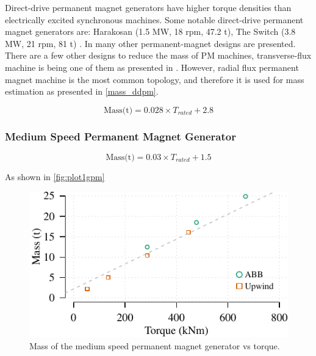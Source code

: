 \documentclass{article}\usepackage{graphicx, color}
\makeatletter
\def\maxwidth{ %
  \ifdim\Gin@nat@width>\linewidth
    \linewidth
  \else
    \Gin@nat@width
  \fi
}
\newenvironment{knitrout}{}{} %
\makeatother
\begin{document}
Direct-drive permanent magnet generators have higher torque densities than electrically excited synchronous machines. Some notable direct-drive permanent magnet generators are: Harakosan (1.5 MW, 18 rpm, 47.2 t), The Switch (3.8 MW, 21 rpm, 81 t) \cite{Duan2009}. In \cite{Bang2008,upwind2011} many other permanent-magnet designs are presented. There are a few other designs to reduce the mass of PM machines, transverse-flux machine is being one of them as presented in \cite{Bang2009}. However, radial flux permanent magnet machine is the most common topology, and therefore it is used for mass estimation as presented in \autoref{mass_ddpm}.

\begin{equation}
  \text{Mass(t)} = 0.028 \times {T_{rated}} + 2.8
  \label{mass_ddpm}
\end{equation}


\subsubsection{Medium Speed Permanent Magnet Generator}

\begin{equation}
  \text{Mass(t)} = 0.03 \times {T_{rated}} + 1.5
\end{equation}

As shown in \autoref{fig:plot1gpm}

\begin{knitrout}
\color{fgcolor}\begin{figure}[]

\includegraphics[width=\maxwidth]{figure/plot1gpm} \caption[Mass of the medium speed permanent magnet generator vs torque]{Mass of the medium speed permanent magnet generator vs torque.\label{fig:plot1gpm}}
\end{figure}


\end{knitrout}
\end{document}
